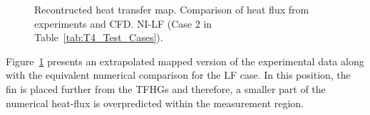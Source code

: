 \documentclass{AIAA}
\begin{document}
\begin{figure}[!h]
\center
\begin{adjustbox}{max width=1.1\columnwidth,center}
%
\end{adjustbox}
\caption{Recontructed heat transfer map. Comparison of heat flux from experiments and CFD. NI-LF (Case 2 in Table~\ref{tab:T4_Test_Cases}).}
\label{fig:HeatFluxNILF}
\end{figure} 


Figure~\ref{fig:HeatFluxNILF} presents an extrapolated mapped version of the experimental data along with the equivalent numerical comparison for the LF case.
In this position, the fin is placed further from the TFHGs and therefore, a smaller part of the numerical heat-flux is overpredicted within the measurement region.
\end{document}
